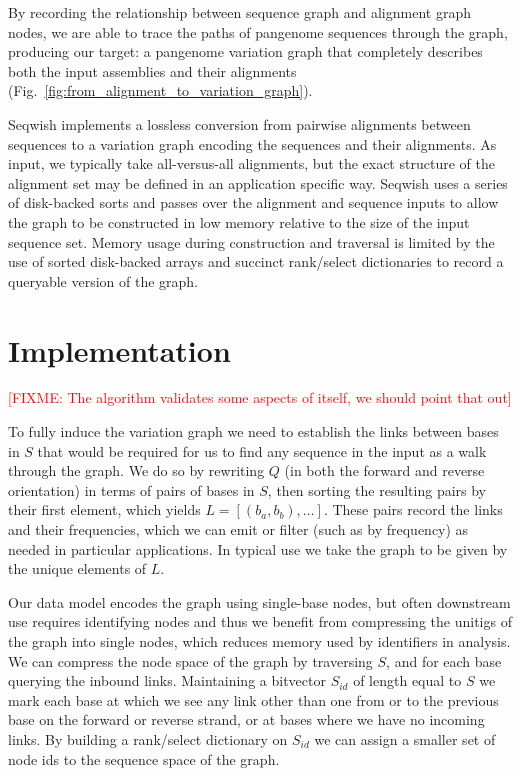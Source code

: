 \documentclass{bioinfo}
\newcommand{\red}[1]{{\textcolor{Red}{#1}}}
\newcommand{\FIXME}[1]{\red{[FIXME: #1]}}
\begin{document}
By recording the relationship between sequence graph and alignment graph nodes, we are able to trace the paths of pangenome sequences through the graph, producing our target: a pangenome variation graph that completely describes both the input assemblies and their alignments (Fig.~\ref{fig:from_alignment_to_variation_graph}).


Seqwish implements a lossless conversion from pairwise alignments between sequences to a variation graph encoding the sequences and their alignments.
As input, we typically take all-versus-all alignments, but the exact structure of the alignment set may be defined in an application specific way.
Seqwish uses a series of disk-backed sorts and passes over the alignment and sequence inputs to allow the graph to be constructed in low memory relative to the size of the input sequence set.
Memory usage during construction and traversal is limited by the use of sorted disk-backed arrays and succinct rank/select dictionaries to record a queryable version of the graph.

    


    \section{Implementation}
    \label{sec:implementation}

    \FIXME{The algorithm validates some aspects of itself, we should point that out}


    To fully induce the variation graph we need to establish the links between bases in $S$ that would be required for us to find any sequence in the input as a walk through the graph.
    We do so by rewriting $Q$ (in both the forward and reverse orientation) in terms of pairs of bases in $S$, then sorting the resulting pairs by their first element, which yields $L = [(b_{a}, b_{b}), \ldots ]$.
    These pairs record the links and their frequencies, which we can emit or filter (such as by frequency) as needed in particular applications.
    In typical use we take the graph to be given by the unique elements of $L$.

    Our data model encodes the graph using single-base nodes, but often downstream use requires identifying nodes and thus we benefit from compressing the unitigs of the graph into single nodes, which reduces memory used by identifiers in analysis.
    We can compress the node space of the graph by traversing $S$, and for each base querying the inbound links.
    Maintaining a bitvector $S_{id}$ of length equal to $S$ we mark each base at which we see any link other than one from or to the previous base on the forward or reverse strand, or at bases where we have no incoming links.
    By building a rank/select dictionary on $S_{id}$ we can assign a smaller set of node ids to the sequence space of the graph.
\end{document}

